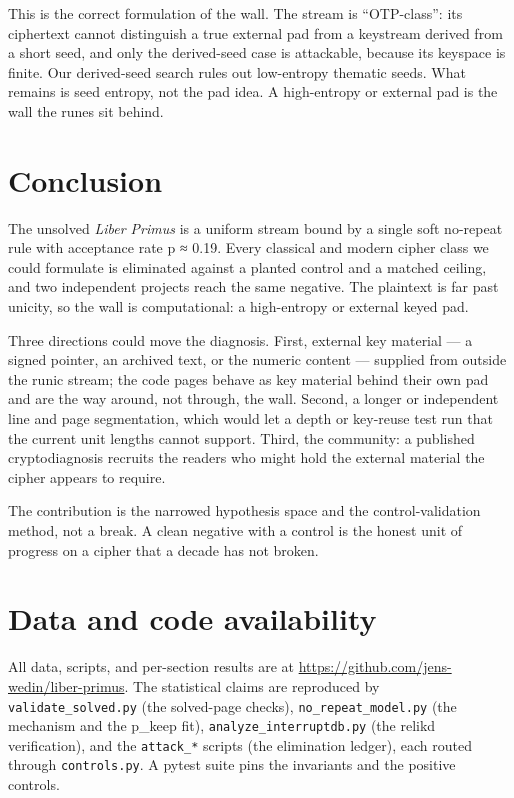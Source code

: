 \documentclass[11pt]{article}
\begin{document}
This is the correct formulation of the wall. The stream is ``OTP-class'': its ciphertext cannot distinguish a true external pad from a keystream derived from a short seed, and only the derived-seed case is attackable, because its keyspace is finite. Our derived-seed search rules out low-entropy thematic seeds. What remains is seed entropy, not the pad idea. A high-entropy or external pad is the wall the runes sit behind.

\section{Conclusion}

The unsolved \emph{Liber Primus} is a uniform stream bound by a single soft no-repeat rule with acceptance rate p ≈ 0.19. Every classical and modern cipher class we could formulate is eliminated against a planted control and a matched ceiling, and two independent projects reach the same negative. The plaintext is far past unicity, so the wall is computational: a high-entropy or external keyed pad.

Three directions could move the diagnosis. First, external key material --- a signed pointer, an archived text, or the numeric content --- supplied from outside the runic stream; the code pages behave as key material behind their own pad and are the way around, not through, the wall. Second, a longer or independent line and page segmentation, which would let a depth or key-reuse test run that the current unit lengths cannot support. Third, the community: a published cryptodiagnosis recruits the readers who might hold the external material the cipher appears to require.

The contribution is the narrowed hypothesis space and the control-validation method, not a break. A clean negative with a control is the honest unit of progress on a cipher that a decade has not broken.

\section{Data and code availability}

All data, scripts, and per-section results are at \url{https://github.com/jens-wedin/liber-primus}. The statistical claims are reproduced by \texttt{validate\_solved.py} (the solved-page checks), \texttt{no\_repeat\_model.py} (the mechanism and the p\_keep fit), \texttt{analyze\_interruptdb.py} (the relikd verification), and the \texttt{attack\_*} scripts (the elimination ledger), each routed through \texttt{controls.py}. A pytest suite pins the invariants and the positive controls.
\end{document}
